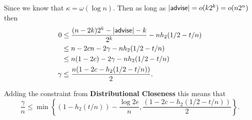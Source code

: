 Since we know that $\kappa =\omega(\log n)$. Then as long as $|{\mathsf{advise}}| = o(k 2^k) = o (n2^n)$ then 
\begin{align*}
0 &\le \frac{(n-2k)2^k-|{\mathsf{advise}}|-k}{2^k} - nh_2(1/2-t/n) \\
 &\le n-2cn - 2\gamma - nh_2(1/2-t/n) \\
&\le n(1-2c)-2\gamma - nh_2(1/2-t/n)\\
\gamma &\le \frac{n(1-2c - h_2(1/2-t/n))}{2}.\\
\end{align*}

Adding the constraint from \textbf{Distributional Closeness}
this means that 
\[
\frac{\gamma}{n} \le \min\left\{(1-h_2(t/n)) - \frac{\log{2e}}{n}, \frac{(1-2c - h_2(1/2-t/n))}{2}\right\}.
\]



